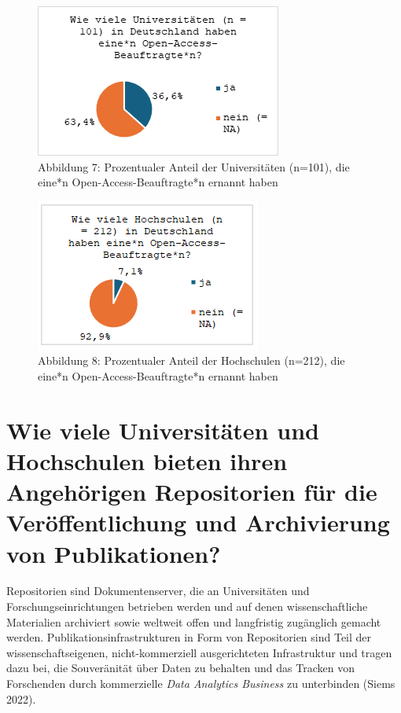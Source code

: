 \documentclass[a4paper,
fontsize=11pt,
oneside,
numbers=noperiodatend,
parskip=half-,
bibliography=totoc,
final
]{scrartcl}
\begin{document}
\begin{figure}[H]
\centering
\includegraphics[]{img/image008.png}
\caption{Abbildung 7: Prozentualer Anteil der Universitäten (n=101), die eine*n Open-Access-Beauftragte*n ernannt haben}
\end{figure}

\begin{figure}[H]
\centering
\includegraphics[]{img/image007.png}
\caption{Abbildung 8: Prozentualer Anteil der Hochschulen (n=212), die eine*n Open-Access-Beauftragte*n ernannt haben}
\end{figure}

\section{Wie viele Universitäten und Hochschulen bieten ihren
Angehörigen Repositorien für die Veröffentlichung und Archivierung von
Publikationen?}\label{wie-viele-universituxe4ten-und-hochschulen-bieten-ihren-angehuxf6rigen-repositorien-fuxfcr-die-veruxf6ffentlichung-und-archivierung-von-publikationen}

Repositorien sind Dokumentenserver, die an Universitäten und
Forschungseinrichtungen betrieben werden und auf denen wissenschaftliche
Materialien archiviert sowie weltweit offen und langfristig zugänglich
gemacht werden. Publikationsinfrastrukturen in Form von Repositorien
sind Teil der wissenschaftseigenen, nicht-kommerziell ausgerichteten
Infrastruktur und tragen dazu bei, die Souveränität über Daten zu
behalten und das Tracken von Forschenden durch kommerzielle \emph{Data
Analytics Business} zu unterbinden (Siems 2022).
\end{document}
